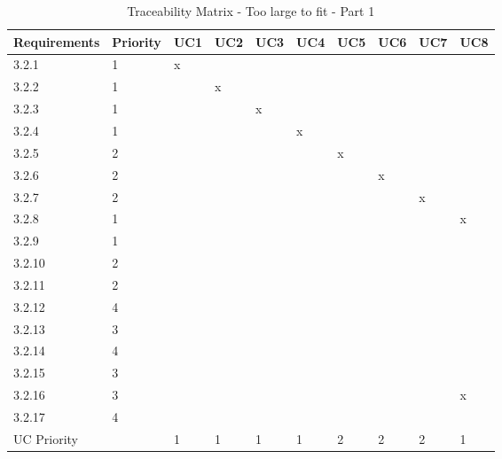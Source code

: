 \documentclass[runningheads,a4paper]{article}
\begin{document}
\begin{table}[]
\centering
\caption{Traceability Matrix - Too large to fit - Part 1}
\label{my-label}
\begin{tabular}{|l|l|l|l|l|l|l|l|l|l|}
\hline
Requirements & Priority & UC1 & UC2 & UC3 & UC4 & UC5 & UC6 & UC7 & UC8 \\ \hline
3.2.1 & 1 & x &  &  &  &  &  &  &  \\ \hline
3.2.2 & 1 &  & x &  &  &  &  &  &  \\ \hline
3.2.3 & 1 &  &  & x &  &  &  &  &  \\ \hline
3.2.4 & 1 &  &  &  & x &  &  &  &  \\ \hline
3.2.5 & 2 &  &  &  &  & x &  &  &  \\ \hline
3.2.6 & 2 &  &  &  &  &  & x &  &  \\ \hline
3.2.7 & 2 &  &  &  &  &  &  & x &  \\ \hline
3.2.8 & 1 &  &  &  &  &  &  &  & x \\ \hline
3.2.9 & 1 &  &  &  &  &  &  &  &  \\ \hline
3.2.10 & 2 &  &  &  &  &  &  &  &  \\ \hline
3.2.11 & 2 &  &  &  &  &  &  &  &  \\ \hline
3.2.12 & 4 &  &  &  &  &  &  &  &  \\ \hline
3.2.13 & 3 &  &  &  &  &  &  &  &  \\ \hline
3.2.14 & 4 &  &  &  &  &  &  &  &  \\ \hline
3.2.15 & 3 &  &  &  &  &  &  &  &  \\ \hline
3.2.16 & 3 &  &  &  &  &  &  &  & x \\ \hline
3.2.17 & 4 &  &  &  &  &  &  &  &  \\ \hline
\multicolumn{2}{|l|}{UC Priority} & 1 & 1 & 1 & 1 & 2 & 2 & 2 & 1 \\ \hline
\end{tabular}
\end{table}
\end{document}
